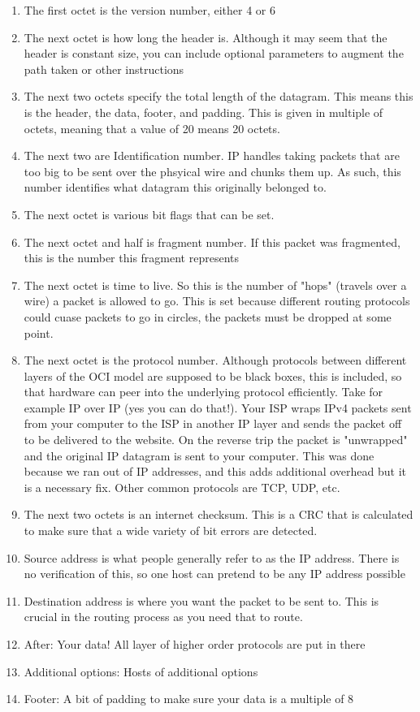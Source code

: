 \begin{enumerate}
  \item The first octet is the version number, either 4 or 6
  \item The next octet is how long the header is.
    Although it may seem that the header is constant size, you can include optional parameters to augment the path taken or other instructions
  \item The next two octets specify the total length of the datagram.
    This means this is the header, the data, footer, and padding.
    This is given in multiple of octets, meaning that a value of 20 means 20 octets.
  \item The next two are Identification number.
    IP handles taking packets that are too big to be sent over the phsyical wire and chunks them up.
    As such, this number identifies what datagram this originally belonged to.
  \item The next octet is various bit flags that can be set.
  \item The next octet and half is fragment number.
    If this packet was fragmented, this is the number this fragment represents
  \item The next octet is time to live.
    So this is the number of "hops" (travels over a wire) a packet is allowed to go.
    This is set because different routing protocols could cuase packets to go in circles, the packets must be dropped at some point.
  \item The next octet is the protocol number.
    Although protocols between different layers of the OCI model are supposed to be black boxes, this is included, so that hardware can peer into the underlying protocol efficiently.
    Take for example IP over IP (yes you can do that!).
    Your ISP wraps IPv4 packets sent from your computer to the ISP in another IP layer and sends the packet off to be delivered to the website.
    On the reverse trip the packet is "unwrapped" and the original IP datagram is sent to your computer.
    This was done because we ran out of IP addresses, and this adds additional overhead but it is a necessary fix.
    Other common protocols are TCP, UDP, etc.
  \item The next two octets is an internet checksum.
    This is a CRC that is calculated to make sure that a wide variety of bit errors are detected.
  \item Source address is what people generally refer to as the IP address.
    There is no verification of this, so one host can pretend to be any IP address possible
  \item Destination address is where you want the packet to be sent to.
    This is crucial in the routing process as you need that to route.
  \item After: Your data! All layer of higher order protocols are put in there
  \item Additional options: Hosts of additional options
  \item Footer: A bit of padding to make sure your data is a multiple of 8
\end{enumerate}


